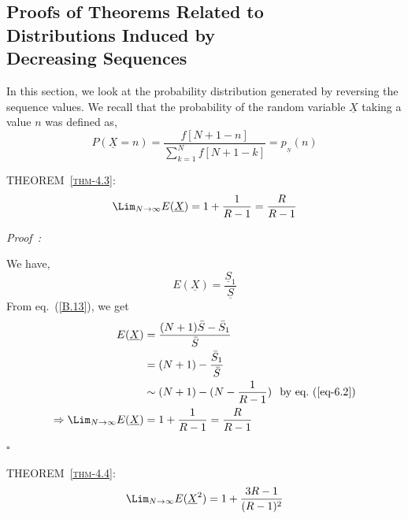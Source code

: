 \begin{multicols}{2}
\newpage

\section{Proofs of Theorems Related to\\ Distributions Induced by\\ Decreasing Sequences}\label{section-7}

In this section, we look at the probability distribution generated by reversing the sequence values. We recall that the probability of the random variable $\underline{X}$ taking a value $n$ was defined as, 
\begin{equation}
P(\underline{X} = n) =\frac{f[N+1-n]}{\displaystyle{\sum_{k=1}^{N}f[N+1-k]}} = p_{_{\underline{N}}}(n)\label{eq-7.1}
\end{equation}

\vspace{-.6cm}

\textsc{THEOREM~{\ref{thm-4.3}}:}
\begin{eqnarray*}
\displaystyle{\Lim_{N \rightarrow \infty}}E(\underline{X}) = 1 + \displaystyle{\frac{1}{R-1}} =  \displaystyle{\frac{R}{R-1}}
\end{eqnarray*}

\vspace{-.5cm}

{\it Proof~:}

We have,
\begin{equation}
E(\underline{X}) = \frac{\underline{S}_1}{\underline{S}}
\end{equation}
From eq.~(\ref{B.13}), we get
\begin{align}
E(\underline{X}) &= \frac{(N+1)\bar{S} - \bar{S}_1}{\bar{S}}\nonumber\\
&= (N+1) - \frac{\bar{S}_1}{\bar{S}}\nonumber\\
&\sim (N+1) - (N - \frac{1}{R-1}) \hspace{0.1in}\textup{by eq.~(\ref{eq-6.2}})\nonumber\\
\Rightarrow  \Lim_{N\rightarrow \infty}E(\underline{X}) &= 1 + \displaystyle{\frac{1}{R-1}} = \displaystyle{\frac{R}{R-1}}\label{eq-7.3}
\end{align}
\hfill{$\square$}\\

\vspace{-.8cm}

\textsc{THEOREM~{\ref{thm-4.4}}:}
\begin{eqnarray*}
\displaystyle{\Lim_{N \rightarrow \infty}}E(\underline{X}^2) = 1 + \displaystyle{\frac{3R-1}{(R-1)^2}}
\end{eqnarray*}


\end{multicols}
